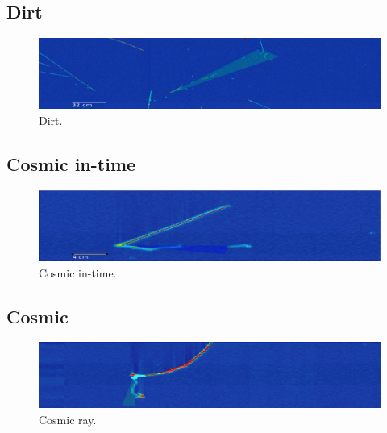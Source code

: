 \subsection*{Dirt}
\begin{figure}[H]
\centering
  \includegraphics[width=0.75\linewidth]{evds/1_5516_275775_dirt_kResCCNuNeutronPi0.png}
  \caption{Dirt.}
\end{figure}

\subsection*{Cosmic in-time}
\begin{figure}[H]
\centering
  \includegraphics[width=0.75\linewidth]{evds/r5195_sr44_e2221.png}
  \caption{Cosmic in-time.}
\end{figure}

\subsection*{Cosmic}
\begin{figure}[H]
\centering
  \includegraphics[width=0.75\linewidth]{evds/R5273_SR29_E1486.png}
  \caption{Cosmic ray.}
\end{figure}


